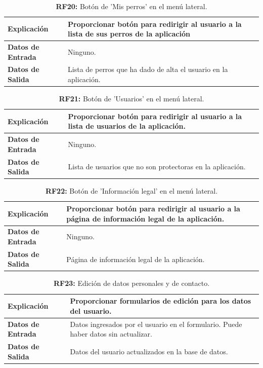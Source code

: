 \documentclass[a4paper, 12pt]{article}
\begin{document}
\begin{table}[H]
\captionsetup{justification=raggedright,singlelinecheck=false}
\caption{\textbf{RF20:} Botón de 'Mis perros' en el menú lateral.}
\label{tab:RF20}
	\begin{tabular}{|m{5cm}|m{10cm}|}
	\hline
	\textbf{Explicación} & Proporcionar botón para redirigir al usuario a la lista de sus perros de la aplicación \\ 
	\hline
	\textbf{Datos de Entrada} &  Ninguno. \\ 
	\hline
	\textbf{Datos de Salida} &  Lista de perros que ha dado de alta el usuario en la aplicación. \\ 
	\hline
\end{tabular}
\end{table}

\begin{table}[H]
\captionsetup{justification=raggedright,singlelinecheck=false}
\caption{\textbf{RF21:} Botón de 'Usuarios' en el menú lateral.}
\label{tab:RF21}
	\begin{tabular}{|m{5cm}|m{10cm}|}
	\hline
	\textbf{Explicación} & Proporcionar botón para redirigir al usuario a la lista de usuarios de la aplicación. \\ 
	\hline
	\textbf{Datos de Entrada} &  Ninguno. \\ 
	\hline
	\textbf{Datos de Salida} &  Lista de usuarios que no son protectoras en la aplicación. \\ 
	\hline
\end{tabular}
\end{table}

\begin{table}[H]
\captionsetup{justification=raggedright,singlelinecheck=false}
\caption{\textbf{RF22:} Botón de 'Información legal' en el menú lateral.}
\label{tab:RF22}
	\begin{tabular}{|m{5cm}|m{10cm}|}
	\hline
	\textbf{Explicación} & Proporcionar botón para redirigir al usuario a la página de información legal de la aplicación. \\ 
	\hline
	\textbf{Datos de Entrada} &  Ninguno. \\ 
	\hline
	\textbf{Datos de Salida} &  Página de información legal de la aplicación. \\ 
	\hline
\end{tabular}
\end{table}

\begin{table}[H]
\captionsetup{justification=raggedright,singlelinecheck=false}
\caption{\textbf{RF23:} Edición de datos personales y de contacto.}
\label{tab:RF23}
	\begin{tabular}{|m{5cm}|m{10cm}|}
	\hline
	\textbf{Explicación} & Proporcionar formularios de edición para los datos del usuario. \\ 
	\hline
	\textbf{Datos de Entrada} & Datos ingresados por el usuario en el formulario. Puede haber datos sin actualizar. \\ 
	\hline
	\textbf{Datos de Salida} &  Datos del usuario actualizados en la base de datos. \\ 
	\hline
\end{tabular}
\end{table}
\end{document}
